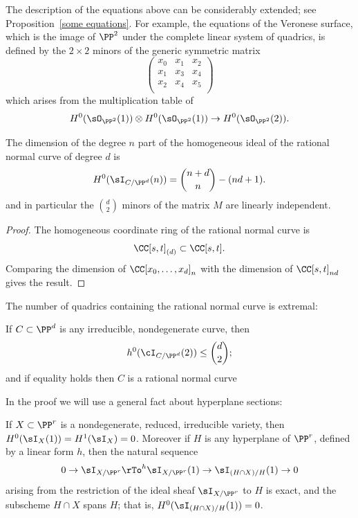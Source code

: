 \begin{fact}\label{Veronese equations fact}
 The description of the equations above can be considerably extended; see Proposition~\ref{some equations}. For example, the equations of the Veronese surface, which is the image of $\PP^{2}$
 under the complete linear system of quadrics, is defined by the $2\times 2$ minors of the generic
 symmetric matrix 
 $$
 \begin{pmatrix}
 x_{0}&x_{1}&x_{2}\\
  x_{1}&x_{3}&x_{4}\\
   x_{2}&x_{4}&x_{5}\\
\end{pmatrix}
$$
which arises from the multiplication table of 
$$
H^{0}(\sO_{\PP^{2}}(1)) \otimes H^{0}(\sO_{\PP^{2}}(1)) \to H^{0}(\sO_{\PP^{2}}(2)).
$$
\end{fact}

\begin{corollary}\label{forms vanishing on the RNC}
The dimension of the degree $n$ part of the homogeneous ideal of the rational normal curve of degree $d$ is
$$
H^0(\sI_{C/\PP^d}(n)) = \binom{n+d}{n} - (nd+1).
$$
and in particular the $\binom{d}{ 2}$ minors of the matrix $M$ are linearly independent.
\end{corollary}

\begin{proof}
The homogeneous coordinate ring of the rational normal curve is $$\CC[s,t]_{(d)}\subset \CC[s,t].$$ Comparing the dimension
of $\CC[x_0,\dots,x_d]_n$ with the dimension of $\CC[s,t]_{nd}$ gives the result.
\end{proof}

The number of quadrics containing the rational normal curve is extremal:

\begin{proposition}\label{rnc on most quadrics}
If $C \subset \PP^d$ is any irreducible, nondegenerate curve, then
$$
h^0(\cI_{C/\PP^d}(2)) \leq  \binom{d}{2};
$$
and if equality holds then $C$ is a rational normal curve
\end{proposition}

In the proof we will use a general fact about hyperplane sections:

\begin{proposition}\label{arbitrary hyperplane}
If $X\subset \PP^r$ is a nondegenerate, reduced, irreducible variety, 
then $H^0(\sI_X(1)) = H^1 (\sI_X) = 0$. Moreover if $H$ is any hyperplane of $\PP^r$, defined by
a linear form $h$, then the natural
sequence
$$
0\to \sI_{X/\PP^r} \rTo^h \sI_{X/\PP^r}(1)\to \sI_{(H\cap X)/H}(1)\to 0
$$
arising from the restriction of the ideal sheaf $\sI_{X/\PP^r}$ to $H$ is exact, and the subscheme
$H\cap X$ spans $H$; that is, $H^0(\sI_{(H\cap X)/H}(1)) = 0$.
\end{proposition}

